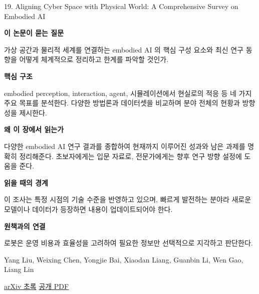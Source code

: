 \documentclass[11pt,openany]{book}
\begin{document}
\begin{termcard}{19. Aligning Cyber Space with Physical World: A Comprehensive Survey on Embodied AI}

\par

\medskip

{\sffamily\bfseries\color{deepblue} 이 논문이 묻는 질문}\par

가상 공간과 물리적 세계를 연결하는 embodied AI 의 핵심 구성 요소와 최신 연구 동향을 어떻게 체계적으로 정리하고 한계를 파악할 것인가.

\smallskip

{\sffamily\bfseries\color{deepblue} 핵심 구조}\par

embodied perception, interaction, agent, 시뮬레이션에서 현실로의 적응 등 네 가지 주요 목표를 분석한다. 다양한 방법론과 데이터셋을 비교하며 분야 전체의 현황과 방향성을 제시한다.

\smallskip

{\sffamily\bfseries\color{deepblue} 왜 이 장에서 읽는가}\par

다양한 embodied AI 연구 결과를 종합하여 현재까지 이루어진 성과와 남은 과제를 명확히 정리해준다. 초보자에게는 입문 자료로, 전문가에게는 향후 연구 방향 설정에 도움을 준다.

\smallskip

{\sffamily\bfseries\color{coral} 읽을 때의 경계}\par

이 조사는 특정 시점의 기술 수준을 반영하고 있으며, 빠르게 발전하는 분야라 새로운 모델이나 데이터가 등장하면 내용이 업데이트되어야 한다.

\smallskip

{\sffamily\bfseries\color{teal} 원책과의 연결}\par

로봇은 운영 비용과 효율성을 고려하여 필요한 정보만 선택적으로 지각하고 판단한다.

\medskip

{\footnotesize\color{muted} Yang Liu, Weixing Chen, Yongjie Bai, Xiaodan Liang, Guanbin Li, Wen Gao, Liang Lin\par

\href{https://arxiv.org/abs/2407.06886}{arXiv 초록} \quad \href{https://arxiv.org/pdf/2407.06886}{공개 PDF}\par}

\end{termcard}
\end{document}
